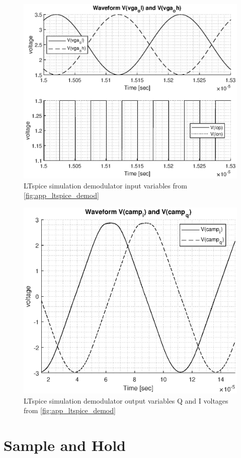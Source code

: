 \begin{figure}[htbp]
	\centering
	\includegraphics[width=.8\textwidth]{Figures/3_demod_sim_in.eps}
	\caption{LTspice simulation demodulator input variables from \cref{fig:app_ltspice_demod}}
	\label{fig:4_demod_sim_in}
\end{figure}
\begin{figure}[htbp]
	\centering
	\includegraphics[width=.8\textwidth]{Figures/3_demod_sim_out.eps}
	\caption{LTspice simulation demodulator output variables Q and I voltages from \cref{fig:app_ltspice_demod}}
	\label{fig:4_demod_sim_out}
\end{figure}
\section{Sample and Hold}

